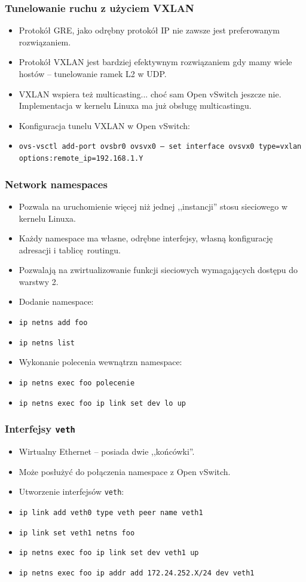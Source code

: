 \documentclass[dvipsnames,table]{beamer}
\begin{document}
\begin{frame}
\frametitle{Tunelowanie ruchu z użyciem VXLAN}
\begin{itemize}
	\item Protokół GRE, jako odrębny protokół IP nie zawsze jest preferowanym rozwiązaniem.
	\item Protokół VXLAN jest bardziej efektywnym rozwiązaniem gdy mamy wiele hostów -- tunelowanie ramek L2 w UDP.
	\item VXLAN wspiera też multicasting... choć sam Open vSwitch jeszcze nie. Implementacja w kernelu Linuxa ma już obsługę multicastingu.
	\item Konfiguracja tunelu VXLAN w Open vSwitch:
	\item {\tt ovs-vsctl add-port ovsbr0 ovsvx0 -- set interface ovsvx0 type=vxlan options:remote\_ip=192.168.1.Y}
\end{itemize}
\end{frame}

\begin{frame}
\frametitle{Network namespaces}
\begin{itemize}
	\item Pozwala na uruchomienie więcej niż jednej ,,instancji'' stosu sieciowego w kernelu Linuxa. 
	\item Każdy namespace ma własne, odrębne interfejsy, własną konfigurację adresacji i tablicę routingu.
	\item Pozwalają na zwirtualizowanie funkcji sieciowych wymagających dostępu do warstwy 2.
	\item Dodanie namespace:
	\item {\tt ip netns add foo}
	\item {\tt ip netns list}
	\item Wykonanie polecenia wewnątrzn namespace:
	\item {\tt ip netns exec foo polecenie}
	\item {\tt ip netns exec foo ip link set dev lo up}
\end{itemize}
\end{frame}

\begin{frame}
\frametitle{Interfejsy {\tt veth}}
\begin{itemize}
	\item Wirtualny Ethernet -- posiada dwie ,,końcówki''. 
	\item Może posłużyć do połączenia namespace z Open vSwitch.
	\item Utworzenie interfejsów {\tt veth}:
	\item {\tt ip link add veth0 type veth peer name veth1}
	\item {\tt ip link set veth1 netns foo}
	\item {\tt ip netns exec foo ip link set dev veth1 up }
	\item {\tt ip netns exec foo ip addr add 172.24.252.X/24 dev veth1} 
\end{itemize}
\end{frame}
\end{document}
